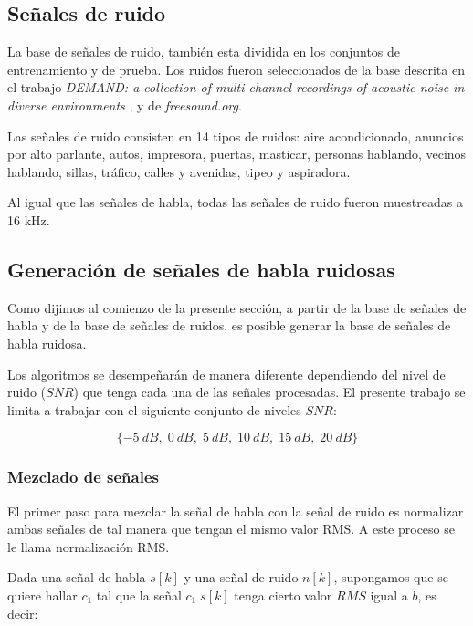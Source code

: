 \subsection{Señales de ruido}

La base de señales de ruido, también esta dividida en los conjuntos de entrenamiento y de prueba. Los ruidos fueron seleccionados de la base descrita en el trabajo \emph{DEMAND: a collection of multi-channel recordings of acoustic noise in diverse environments} \cite{demand_a_collection_of_multi_channel_recordings_of_acoustic_noise_in_diverse_environments}, y de \emph{freesound.org}.

Las señales de ruido consisten en 14 tipos de ruidos: aire acondicionado, anuncios por alto parlante, autos, impresora, puertas, masticar, personas hablando, vecinos hablando, sillas, tráfico, calles y avenidas, tipeo y aspiradora.

Al igual que las señales de habla, todas las señales de ruido fueron muestreadas a 16 kHz.

\subsection{Generación de señales de habla ruidosas}
\label{sec:noisy_signals_generation}

Como dijimos al comienzo de la presente sección, a partir de la base de señales de habla y de la base de señales de ruidos, es posible generar la base de señales de habla ruidosa. 

Los algoritmos se desempeñarán de manera diferente dependiendo del nivel de ruido ($SNR$) que tenga cada una de las señales procesadas. El presente trabajo se limita a trabajar con el siguiente conjunto de niveles $SNR$:

\begin{equation*}
	\{ \SI{-5}{dB}, \; \SI{0}{dB}, \; \SI{5}{dB}, \; \SI{10}{dB}, \; \SI{15}{dB}, \; \SI{20}{dB} \}
\end{equation*}

\subsubsection{Mezclado de señales}

El primer paso para mezclar la señal de habla con la señal de ruido es normalizar ambas señales de tal manera que tengan el mismo valor RMS. A este proceso se le llama normalización RMS.

Dada una señal de habla $s[k]$ y una señal de ruido $n[k]$, supongamos que se quiere hallar $c_1$ tal que la señal $c_1 \; s[k]$ tenga cierto valor $RMS$ igual a $b$, es decir:

